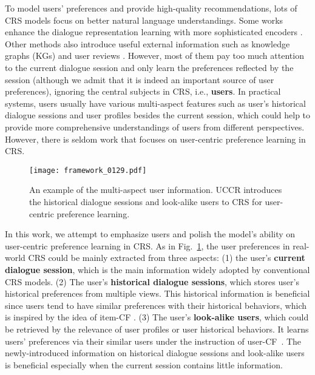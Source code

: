 \documentclass[sigconf,natbib=true]{acmart}
\begin{document}
To model users' preferences and provide high-quality recommendations, lots of CRS models focus on better natural language understandings. Some works enhance the dialogue representation learning with more sophisticated encoders \cite{li2018towards,zhou2020improving}. Other methods also introduce useful external information such as knowledge graphs (KGs) \cite{chen2019towards,zhou2020improving} and user reviews \cite{lu2021revcore}.
However, most of them pay too much attention to the current dialogue session and only learn the preferences reflected by the session (although we admit that it is indeed an important source of user preferences), ignoring the central subjects in CRS, i.e., \textbf{users}. In practical systems, users usually have various multi-aspect features such as user's historical dialogue sessions and user profiles besides the current session, which could help to provide more comprehensive understandings of users from different perspectives. However, there is seldom work that focuses on user-centric preference learning in CRS.

\begin{figure}[!htpb]\centering  \vspace{0mm}
	\texttt{[image: framework\_0129.pdf]}
\caption{An example of the multi-aspect user information. UCCR introduces the historical dialogue sessions and look-alike users to CRS for user-centric preference learning.}
\label{framework}
	\vspace{-2mm}
\end{figure}









In this work, we attempt to emphasize users and polish the model's ability on user-centric preference learning in CRS. As in Fig.~\ref{framework}, the user preferences in real-world CRS could be mainly extracted from three aspects:
(1) the user's \textbf{current dialogue session}, which is the main information widely adopted by conventional CRS models.
(2) The user's \textbf{historical dialogue sessions}, which stores user's historical preferences from multiple views.
This historical information is beneficial since users tend to have similar preferences with their historical behaviors, which is inspired by the idea of item-CF \cite{sarwar2001item}.
(3) The user's \textbf{look-alike users}, which could be retrieved by the relevance of user profiles or user historical behaviors. It learns users' preferences via their similar users under the instruction of user-CF~\cite{zhao2010user}.
The newly-introduced information on historical dialogue sessions and look-alike users is beneficial especially when the current session contains little information.
\end{document}
